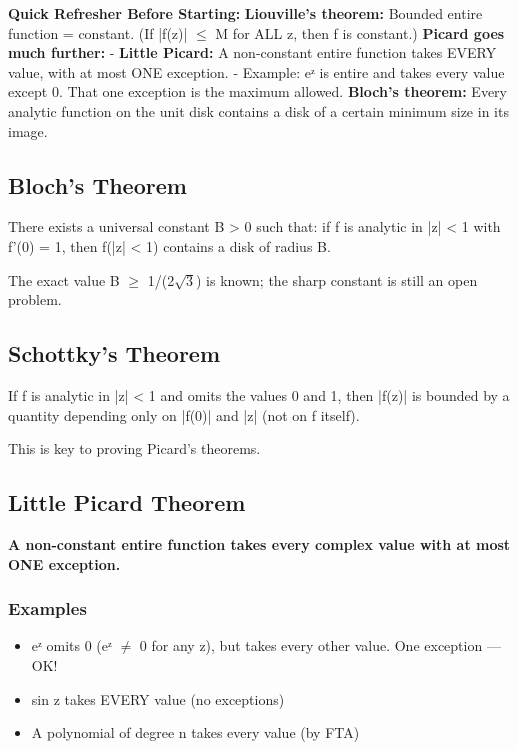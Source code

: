 \documentclass[12pt,a4paper,openany]{book}
\begin{document}
{{\begin{prereqbox}
 \textbf{Quick Refresher Before Starting:}
\textbf{Liouville's theorem:} Bounded entire function = constant. (If |f(z)| $\leq$ M for ALL z, then f is constant.)
\textbf{Picard goes much further:}
- \textbf{Little Picard:} A non-constant entire function takes EVERY value, with at most ONE exception.
- Example: eᶻ is entire and takes every value except 0. That one exception is the maximum allowed.
\textbf{Bloch's theorem:} Every analytic function on the unit disk contains a disk of a certain minimum size in its image.
\end{prereqbox}


\subsection{Bloch's Theorem}
There exists a universal constant B > 0 such that: if f is analytic in |z| < 1 with f'(0) = 1, then f(|z| < 1) contains a disk of radius B.

The exact value B $\geq$ 1/(2$\sqrt{3}$) is known; the sharp constant is still an open problem.

\subsection{Schottky's Theorem}
If f is analytic in |z| < 1 and omits the values 0 and 1, then |f(z)| is bounded by a quantity depending only on |f(0)| and |z| (not on f itself).

This is key to proving Picard's theorems.

\subsection{Little Picard Theorem }

\textbf{A non-constant entire function takes every complex value with at most ONE exception.}

\subsubsection{Examples}
\begin{itemize}[leftmargin=*]
  \item eᶻ omits 0 (eᶻ $\neq$ 0 for any z), but takes every other value. One exception — OK!
  \item sin z takes EVERY value (no exceptions)
  \item A polynomial of degree n takes every value (by FTA)
\end{itemize}

}}
\end{document}
